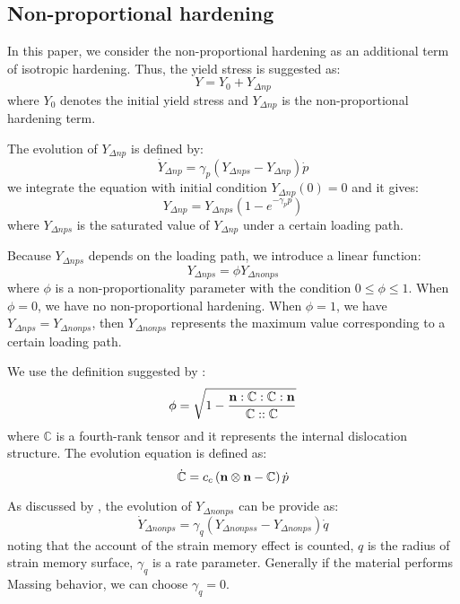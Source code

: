 \subsection{Non-proportional hardening}
In this paper, we consider the non-proportional hardening as an additional term of isotropic hardening.
Thus, the yield stress is suggested as:
\begin{equation}
Y = {Y_0} + {Y_{\Delta np}}
\end{equation}
where $Y_0$ denotes the initial yield stress and ${Y_{\Delta np}}$ is the non-proportional hardening term.

The evolution of ${Y_{\Delta np}}$ is defined by:
\begin{equation}
{\dot Y_{\Delta np}} = {\gamma _p}\left( {{Y_{\Delta nps}} - {Y_{\Delta np}}} \right)\dot p
\end{equation}
we integrate the equation with initial condition ${Y_{\Delta np}}(0)=0$ and it gives:
\begin{equation}
{Y_{\Delta np}} = Y_{\Delta nps}\left( 1-e^{- \gamma_p p} \right)
\end{equation}
where $Y_{\Delta nps}$ is the saturated value of ${Y_{\Delta np}}$ under a certain loading path.

Because ${Y_{\Delta nps}}$ depends on the loading path, we introduce a linear function:
\begin{equation}
{Y_{\Delta nps}} = \phi {Y_{\Delta nonps}}
\end{equation}
where $\phi$ is a non-proportionality parameter with the condition $0 \leq \phi \leq 1$.
When $\phi = 0$, we have no non-proportional hardening.
When $\phi = 1$, we have ${Y_{\Delta nps}} = {Y_{\Delta nonps}}$, then ${Y_{\Delta nonps}}$ represents the maximum value corresponding to a certain loading path.

We use the definition suggested by \cite{tanaka1994nonproportionality}:
\begin{equation}
\phi  = \sqrt {1 - \frac{{{\bf{n}}:\mathbb{C}:\mathbb{C}:{\bf{n}}}}{{\mathbb{C}::\mathbb{C}}}}
\end{equation}
where $\mathbb{C}$ is a fourth-rank tensor and it represents the internal dislocation structure.
The evolution equation is defined as:
\begin{equation}
\dot {\mathbb{C}} = {c_c}\left( {{\bf{n}} \otimes {\bf{n}} - \mathbb{C}} \right)\dot p
\end{equation}

As discussed by \cite{fang2015cyclic}, the evolution of ${Y_{\Delta nonps}}$ can be provide as:
\begin{equation}
{\dot Y_{\Delta nonps}} = {\gamma _q}\left( {{Y_{\Delta nonpss}} - {Y_{\Delta nonps}}} \right)\dot q
\end{equation}
noting that the account of the strain memory effect is counted, $q$ is the radius of strain memory surface, ${\gamma _q}$ is a rate parameter.
Generally if the material performs Massing behavior, we can choose ${\gamma _q}=0$.

